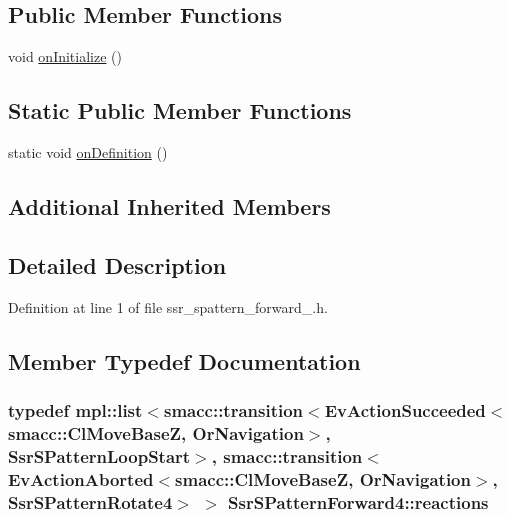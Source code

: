 \subsection*{Public Member Functions}
\begin{DoxyCompactItemize}
\item 
void \hyperlink{structSsrSPatternForward4_ad0ad8bfc383496145a5e535031286f73}{on\+Initialize} ()
\end{DoxyCompactItemize}
\subsection*{Static Public Member Functions}
\begin{DoxyCompactItemize}
\item 
static void \hyperlink{structSsrSPatternForward4_a6d79c39c58f9838e0d15ef954f7678ff}{on\+Definition} ()
\end{DoxyCompactItemize}
\subsection*{Additional Inherited Members}


\subsection{Detailed Description}


Definition at line 1 of file ssr\+\_\+spattern\+\_\+forward\+\_.\+h.



\subsection{Member Typedef Documentation}
\subsubsection[{\texorpdfstring{reactions}{reactions}}]{\setlength{\rightskip}{0pt plus 5cm}typedef mpl\+::list$<${\bf smacc\+::transition}$<$Ev\+Action\+Succeeded$<${\bf smacc\+::\+Cl\+Move\+BaseZ}, {\bf Or\+Navigation}$>$, {\bf Ssr\+S\+Pattern\+Loop\+Start}$>$, {\bf smacc\+::transition}$<$Ev\+Action\+Aborted$<${\bf smacc\+::\+Cl\+Move\+BaseZ}, {\bf Or\+Navigation}$>$, {\bf Ssr\+S\+Pattern\+Rotate4}$>$ $>$ {\bf Ssr\+S\+Pattern\+Forward4\+::reactions}}\hypertarget{structSsrSPatternForward4_adbf672343fe9065db27f75352f6db219}{}\label{structSsrSPatternForward4_adbf672343fe9065db27f75352f6db219}


